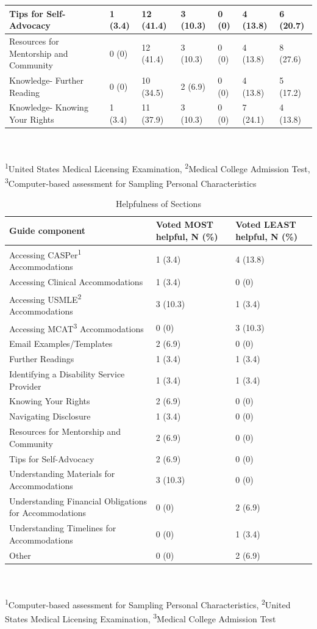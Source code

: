 \documentclass[11.5pt]{sig-alternate} %
\begin{document}
\begin{large}
\begin{table}[htp]
\begin{tabular}{|l|l|l|l|l|l|l|}
Tips for Self-Advocacy & 1 (3.4) & 12 (41.4) & 3 (10.3) & 0 (0) & 4 (13.8) & 6 (20.7) \\ \hline
Resources for Mentorship and Community & 0 (0) & 12 (41.4) & 3 (10.3) & 0 (0) & 4 (13.8) & 8 (27.6) \\ \hline
Knowledge- Further Reading & 0 (0) & 10 (34.5) & 2 (6.9) & 0 (0) & 4 (13.8) & 5 (17.2) \\ \hline
Knowledge- Knowing Your Rights & 1 (3.4) & 11 (37.9) & 3 (10.3) & 0 (0) & 7 (24.1) & 4 (13.8) \\ \hline
\end{tabular}
\\ \\ \textsuperscript{1}United States Medical Licensing Examination, \textsuperscript{2}Medical College Admission Test, \textsuperscript{3}Computer-based assessment for Sampling Personal Characteristics
\end{table}

\begin{table}[htp]
\caption{Helpfulness of Sections}
\begin{tabular}{|l|l|l|}
\hline
Guide component & Voted MOST helpful, N (\%) & Voted LEAST helpful, N (\%) \\ \hline
Accessing CASPer\textsuperscript{1} Accommodations & 1 (3.4) & 4 (13.8) \\ \hline
Accessing Clinical Accommodations & 1 (3.4) & 0 (0) \\ \hline
Accessing USMLE\textsuperscript{2} Accommodations & 3 (10.3) & 1 (3.4) \\ \hline
Accessing MCAT\textsuperscript{3} Accommodations & 0 (0) & 3 (10.3) \\ \hline
Email Examples/Templates & 2 (6.9) & 0 (0) \\ \hline
Further Readings & 1 (3.4) & 1 (3.4) \\ \hline
Identifying a Disability Service Provider & 1 (3.4) & 1 (3.4) \\ \hline
Knowing Your Rights & 2 (6.9) & 0 (0) \\ \hline
Navigating Disclosure & 1 (3.4) & 0 (0) \\ \hline
Resources for Mentorship and Community & 2 (6.9) & 0 (0) \\ \hline
Tips for Self-Advocacy & 2 (6.9) & 0 (0) \\ \hline
Understanding Materials for Accommodations & 3 (10.3) & 0 (0) \\ \hline
Understanding Financial Obligations for Accommodations & 0 (0) & 2 (6.9) \\ \hline
Understanding Timelines for Accommodations & 0 (0) & 1 (3.4) \\ \hline
Other & 0 (0) & 2 (6.9) \\ \hline
\end{tabular}
\\ \\ \textsuperscript{1}Computer-based assessment for Sampling Personal Characteristics, \textsuperscript{2}United States Medical Licensing Examination, \textsuperscript{3}Medical College Admission Test
\end{table}


\end{large}
\end{document}
